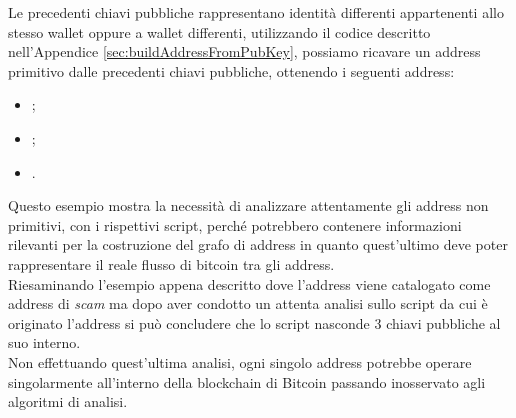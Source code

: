 \begin{example}
\begin{itemize}
    \end{itemize}
    Le precedenti chiavi pubbliche rappresentano identità differenti appartenenti allo stesso wallet oppure a wallet differenti, utilizzando il codice descritto nell'Appendice \ref{sec:buildAddressFromPubKey}, possiamo ricavare un address primitivo dalle precedenti chiavi pubbliche, ottenendo i seguenti address:
    \begin{itemize}
      \item {};
      \item {};
      \item {}.
    \end{itemize}

    Questo esempio mostra la necessità di analizzare attentamente gli address non primitivi, con i rispettivi script, perché potrebbero contenere informazioni rilevanti per la costruzione del grafo di address in quanto quest'ultimo deve poter rappresentare il reale flusso di bitcoin tra gli address.\\
    Riesaminando l'esempio appena descritto dove l'address  viene catalogato come address di \emph{scam} ma dopo aver condotto un attenta analisi sullo script da cui è originato l'address si può concludere che lo script nasconde 3 chiavi pubbliche al suo interno.\\
    Non effettuando quest'ultima analisi, ogni singolo address potrebbe operare singolarmente all'interno della blockchain di Bitcoin passando inosservato agli algoritmi di analisi.
 \end{example}


